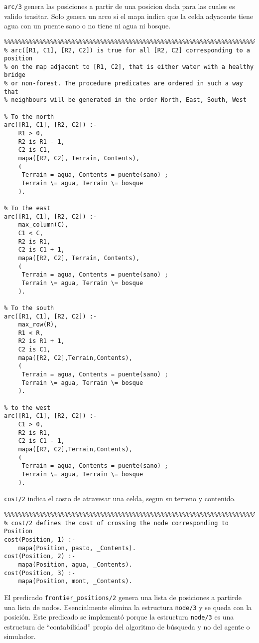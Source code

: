 \documentclass[a4paper,12pt]{report}
\begin{document}
\texttt{arc/3} genera las posiciones a partir de una posicion dada para las cuales es valido trasitar.
Solo genera un arco si el mapa indica que la celda adyacente tiene agua con un puente sano o no tiene ni agua ni bosque.

\begin{verbatim}
%%%%%%%%%%%%%%%%%%%%%%%%%%%%%%%%%%%%%%%%%%%%%%%%%%%%%%%%%%%%%%%%%%%%%%%%%%%%%%%
% arc([R1, C1], [R2, C2]) is true for all [R2, C2] corresponding to a position
% on the map adjacent to [R1, C2], that is either water with a healthy bridge
% or non-forest. The procedure predicates are ordered in such a way that
% neighbours will be generated in the order North, East, South, West

% To the north
arc([R1, C1], [R2, C2]) :-
    R1 > 0,
    R2 is R1 - 1,
    C2 is C1,
    mapa([R2, C2], Terrain, Contents),
    (
     Terrain = agua, Contents = puente(sano) ;
     Terrain \= agua, Terrain \= bosque
    ).

% To the east
arc([R1, C1], [R2, C2]) :-
    max_column(C),
    C1 < C,
    R2 is R1,
    C2 is C1 + 1,
    mapa([R2, C2], Terrain, Contents),
    (
     Terrain = agua, Contents = puente(sano) ;
     Terrain \= agua, Terrain \= bosque
    ).

% To the south
arc([R1, C1], [R2, C2]) :-
    max_row(R),
    R1 < R,
    R2 is R1 + 1,
    C2 is C1,
    mapa([R2, C2],Terrain,Contents),
    (
     Terrain = agua, Contents = puente(sano) ;
     Terrain \= agua, Terrain \= bosque
    ).

% to the west
arc([R1, C1], [R2, C2]) :-
    C1 > 0,
    R2 is R1,
    C2 is C1 - 1,
    mapa([R2, C2],Terrain,Contents),
    (
     Terrain = agua, Contents = puente(sano) ;
     Terrain \= agua, Terrain \= bosque
    ).

\end{verbatim}

\texttt{cost/2} indica el costo de atravesar una celda, segun su terreno y contenido.

\begin{verbatim}
%%%%%%%%%%%%%%%%%%%%%%%%%%%%%%%%%%%%%%%%%%%%%%%%%%%%%%%%%%%%%%%%%%%%%%%%%%%%%%%
% cost/2 defines the cost of crossing the node corresponding to Position
cost(Position, 1) :-
    mapa(Position, pasto, _Contents).
cost(Position, 2) :-
    mapa(Position, agua, _Contents).
cost(Position, 3) :-
    mapa(Position, mont, _Contents).

\end{verbatim}

El predicado \texttt{frontier\_positions/2} genera una lista de posiciones a partirde una lista de nodos.
Esencialmente elimina la estructura \texttt{node/3} y se queda con la posici\'{o}n.
Este predicado se implement\'{o} porque la estructura \texttt{node/3} es una estructura de ``contabilidad'' propia del
algoritmo de b\'{u}squeda y no del agente o simulador.
\end{document}
